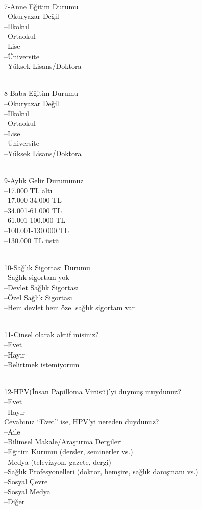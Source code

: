 \documentclass[turkish]{article}
\begin{document}
\\7-Anne Eğitim Durumu
  \\ --Okuryazar Değil
  \\ --İlkokul
  \\ --Ortaokul
  \\ --Lise
  \\ --Üniversite
   \\--Yüksek Lisans/Doktora

\\8-Baba Eğitim Durumu
  \\ --Okuryazar Değil
  \\ --İlkokul
   \\--Ortaokul
   \\--Lise
   \\--Üniversite
   \\--Yüksek Lisans/Doktora

\\9-Aylık Gelir Durumunuz
  \\ --17.000 TL altı
   \\--17.000-34.000 TL
   \\--34.001-61.000 TL
   \\--61.001-100.000 TL
  \\ --100.001-130.000 TL
   \\--130.000 TL üstü

\\10-Sağlık Sigortası Durumu
  \\ --Sağlık sigortam yok
 \\  --Devlet Sağlık Sigortası
  \\ --Özel Sağlık Sigortası
  \\ --Hem devlet hem özel sağlık sigortam var

\\11-Cinsel olarak aktif misiniz?
  \\ --Evet
  \\ --Hayır
  \\ --Belirtmek istemiyorum
   
\\12-HPV(İnsan Papilloma Virüsü)’yi duymuş muydunuz?
  \\ --Evet
  \\ --Hayır
\\Cevabınız “Evet” ise, HPV’yi nereden duydunuz?
  \\ --Aile
\\   --Bilimsel Makale/Araştırma Dergileri
  \\ --Eğitim Kurumu (dersler, seminerler vs.)
  \\ --Medya (televizyon, gazete, dergi)
  \\ --Sağlık Profesyonelleri (doktor, hemşire, sağlık danışmanı vs.)
  \\ --Sosyal Çevre
  \\ --Sosyal Medya 
  \\ --Diğer
\end{document}
